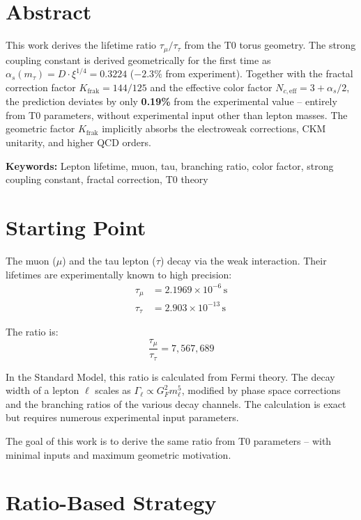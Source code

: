 
	\section*{Abstract}
	This work derives the lifetime ratio $\tau_\mu/\tau_\tau$ from the T0 torus geometry. The strong coupling constant is derived geometrically for the first time as $\alpha_s(m_\tau) = D \cdot \xi^{1/4} = 0.3224$ ($-2.3\%$ from experiment). Together with the fractal correction factor $K_\text{frak} = 144/125$ and the effective color factor $N_{c,\text{eff}} = 3 + \alpha_s/2$, the prediction deviates by only \textbf{0.19\%} from the experimental value -- entirely from T0 parameters, without experimental input other than lepton masses. The geometric factor $K_\text{frak}$ implicitly absorbs the electroweak corrections, CKM unitarity, and higher QCD orders.
	
	\textbf{Keywords:} Lepton lifetime, muon, tau, branching ratio, color factor, strong coupling constant, fractal correction, T0 theory
	
	
	\section{Starting Point}
	
	The muon ($\mu$) and the tau lepton ($\tau$) decay via the weak interaction. Their lifetimes are experimentally known to high precision:
	\begin{align}
		\tau_\mu &= 2.1969 \times 10^{-6} \, \text{s} \\
		\tau_\tau &= 2.903 \times 10^{-13} \, \text{s}
	\end{align}
	
	The ratio is:
	\begin{equation}
		\frac{\tau_\mu}{\tau_\tau} = 7{,}567{,}689
	\end{equation}
	
	In the Standard Model, this ratio is calculated from Fermi theory. The decay width of a lepton $\ell$ scales as $\Gamma_\ell \propto G_F^2 m_\ell^5$, modified by phase space corrections and the branching ratios of the various decay channels. The calculation is exact but requires numerous experimental input parameters.
	
	The goal of this work is to derive the same ratio from T0 parameters -- with minimal inputs and maximum geometric motivation.
	
	
	\section{Ratio-Based Strategy}
	
